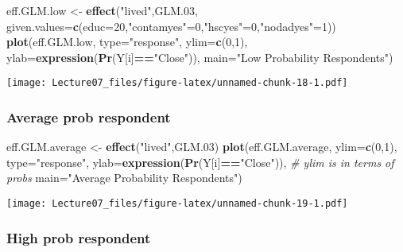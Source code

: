 \documentclass[
]{article}
\newenvironment{Shaded}{\begin{snugshade}}{\end{snugshade}}
\newcommand{\CommentTok}[1]{\textcolor[rgb]{0.56,0.35,0.01}{\textit{#1}}}
\newcommand{\DataTypeTok}[1]{\textcolor[rgb]{0.13,0.29,0.53}{#1}}
\newcommand{\DecValTok}[1]{\textcolor[rgb]{0.00,0.00,0.81}{#1}}
\newcommand{\FloatTok}[1]{\textcolor[rgb]{0.00,0.00,0.81}{#1}}
\newcommand{\KeywordTok}[1]{\textcolor[rgb]{0.13,0.29,0.53}{\textbf{#1}}}
\newcommand{\NormalTok}[1]{#1}
\newcommand{\OperatorTok}[1]{\textcolor[rgb]{0.81,0.36,0.00}{\textbf{#1}}}
\newcommand{\StringTok}[1]{\textcolor[rgb]{0.31,0.60,0.02}{#1}}
\begin{document}
\begin{Shaded}
\begin{Highlighting}[]
\NormalTok{eff.GLM.low <-}\StringTok{ }\KeywordTok{effect}\NormalTok{(}\StringTok{"lived"}\NormalTok{,GLM}\FloatTok{.03}\NormalTok{,}
                      \DataTypeTok{given.values=}\KeywordTok{c}\NormalTok{(}\DataTypeTok{educ=}\DecValTok{20}\NormalTok{,}\StringTok{"contamyes"}\NormalTok{=}\DecValTok{0}\NormalTok{,}\StringTok{"hscyes"}\NormalTok{=}\DecValTok{0}\NormalTok{,}\StringTok{"nodadyes"}\NormalTok{=}\DecValTok{1}\NormalTok{))}
\KeywordTok{plot}\NormalTok{(eff.GLM.low, }\DataTypeTok{type=}\StringTok{"response"}\NormalTok{, }\DataTypeTok{ylim=}\KeywordTok{c}\NormalTok{(}\DecValTok{0}\NormalTok{,}\DecValTok{1}\NormalTok{), }\DataTypeTok{ylab=}\KeywordTok{expression}\NormalTok{(}\KeywordTok{Pr}\NormalTok{(Y[i]}\OperatorTok{==}\StringTok{"Close"}\NormalTok{)), }
     \DataTypeTok{main=}\StringTok{"Low Probability Respondents"}\NormalTok{)}
\end{Highlighting}
\end{Shaded}

\texttt{[image: Lecture07\_files/figure-latex/unnamed-chunk-18-1.pdf]}

\hypertarget{average-prob-respondent}{%
\subsubsection{Average prob respondent}\label{average-prob-respondent}}

\begin{Shaded}
\begin{Highlighting}[]
\NormalTok{eff.GLM.average <-}\StringTok{ }\KeywordTok{effect}\NormalTok{(}\StringTok{"lived"}\NormalTok{,GLM}\FloatTok{.03}\NormalTok{)}
\KeywordTok{plot}\NormalTok{(eff.GLM.average, }\DataTypeTok{ylim=}\KeywordTok{c}\NormalTok{(}\DecValTok{0}\NormalTok{,}\DecValTok{1}\NormalTok{), }\DataTypeTok{type=}\StringTok{"response"}\NormalTok{, }\DataTypeTok{ylab=}\KeywordTok{expression}\NormalTok{(}\KeywordTok{Pr}\NormalTok{(Y[i]}\OperatorTok{==}\StringTok{"Close"}\NormalTok{)),    }\CommentTok{# ylim is in terms of probs}
     \DataTypeTok{main=}\StringTok{"Average Probability Respondents"}\NormalTok{)}
\end{Highlighting}
\end{Shaded}

\texttt{[image: Lecture07\_files/figure-latex/unnamed-chunk-19-1.pdf]}

\hypertarget{high-prob-respondent}{%
\subsubsection{High prob respondent}\label{high-prob-respondent}}
\end{document}
